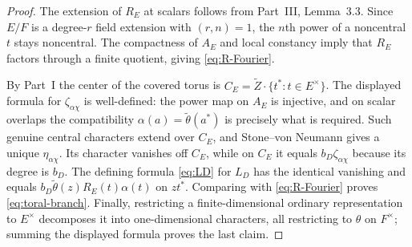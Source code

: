 \documentclass[11pt]{article}
\theoremstyle{plain}
\theoremstyle{definition}
\begin{document}
\begin{proof}
The extension of $R_E$ at scalars follows from Part~III,
Lemma~3.3.  Since $E/F$ is a degree-$r$ field extension with
$(r,n)=1$, the $n$th power of a noncentral $t$ stays noncentral.
The compactness of $A_E$ and local constancy imply that $R_E$
factors through a finite quotient, giving \eqref{eq:R-Fourier}.

By Part~I the center of the covered torus is
$C_E=\widetilde Z\cdot\{t^*:t\in E^\times\}$.  The displayed
formula for $\zeta_{\alpha\chi}$ is well-defined: the
power map on $A_E$ is injective, and on scalar overlaps the
compatibility $\alpha(a)=\widetilde\theta(a^*)$ is precisely
what is required.  Such genuine central characters extend over
$C_E$, and Stone--von Neumann gives a unique $\eta_{\alpha\chi}$.
Its character vanishes off $C_E$, while on $C_E$ it equals
$b_D\zeta_{\alpha\chi}$ because its degree is $b_D$.
The defining formula \eqref{eq:LD} for $L_D$ has the identical
vanishing and equals $b_D\widetilde\theta(z)R_E(t)\alpha(t)$
on $z t^*$.  Comparing with \eqref{eq:R-Fourier} proves
\eqref{eq:toral-branch}.  Finally, restricting a finite-dimensional
ordinary representation to $E^\times$ decomposes it into
one-dimensional characters, all restricting to $\theta$ on
$F^\times$; summing the displayed formula proves the last claim.
\end{proof}
\end{document}
